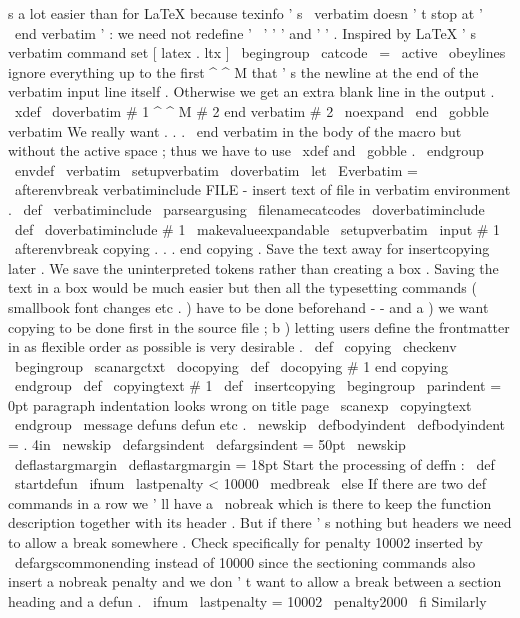 {{s
a
lot
easier
than
for
LaTeX
%
because
texinfo
'
s
\
verbatim
doesn
'
t
stop
at
'
\
end
{
verbatim
}
'
:
%
we
need
not
redefine
'
\
'
'
{
'
and
'
}
'
.
%
%
Inspired
by
LaTeX
'
s
verbatim
command
set
[
latex
.
ltx
]
%
\
begingroup
\
catcode
\
=
\
active
\
obeylines
%
%
ignore
everything
up
to
the
first
^
^
M
that
'
s
the
newline
at
the
end
%
of
the
verbatim
input
line
itself
.
Otherwise
we
get
an
extra
blank
%
line
in
the
output
.
\
xdef
\
doverbatim
#
1
^
^
M
#
2
end
verbatim
{
#
2
\
noexpand
\
end
\
gobble
verbatim
}
%
%
We
really
want
{
.
.
.
\
end
verbatim
}
in
the
body
of
the
macro
but
%
without
the
active
space
;
thus
we
have
to
use
\
xdef
and
\
gobble
.
\
endgroup
%
\
envdef
\
verbatim
{
%
\
setupverbatim
\
doverbatim
}
\
let
\
Everbatim
=
\
afterenvbreak
%
verbatiminclude
FILE
-
insert
text
of
file
in
verbatim
environment
.
%
\
def
\
verbatiminclude
{
\
parseargusing
\
filenamecatcodes
\
doverbatiminclude
}
%
\
def
\
doverbatiminclude
#
1
{
%
{
%
\
makevalueexpandable
\
setupverbatim
\
input
#
1
\
afterenvbreak
}
%
}
%
copying
.
.
.
end
copying
.
%
Save
the
text
away
for
insertcopying
later
.
%
%
We
save
the
uninterpreted
tokens
rather
than
creating
a
box
.
%
Saving
the
text
in
a
box
would
be
much
easier
but
then
all
the
%
typesetting
commands
(
smallbook
font
changes
etc
.
)
have
to
be
done
%
beforehand
-
-
and
a
)
we
want
copying
to
be
done
first
in
the
source
%
file
;
b
)
letting
users
define
the
frontmatter
in
as
flexible
order
as
%
possible
is
very
desirable
.
%
\
def
\
copying
{
\
checkenv
{
}
\
begingroup
\
scanargctxt
\
docopying
}
\
def
\
docopying
#
1
end
copying
{
\
endgroup
\
def
\
copyingtext
{
#
1
}
}
%
\
def
\
insertcopying
{
%
\
begingroup
\
parindent
=
0pt
%
paragraph
indentation
looks
wrong
on
title
page
\
scanexp
\
copyingtext
\
endgroup
}
\
message
{
defuns
}
%
defun
etc
.
\
newskip
\
defbodyindent
\
defbodyindent
=
.
4in
\
newskip
\
defargsindent
\
defargsindent
=
50pt
\
newskip
\
deflastargmargin
\
deflastargmargin
=
18pt
%
Start
the
processing
of
deffn
:
\
def
\
startdefun
{
%
\
ifnum
\
lastpenalty
<
10000
\
medbreak
\
else
%
If
there
are
two
def
commands
in
a
row
we
'
ll
have
a
\
nobreak
%
which
is
there
to
keep
the
function
description
together
with
its
%
header
.
But
if
there
'
s
nothing
but
headers
we
need
to
allow
a
%
break
somewhere
.
Check
specifically
for
penalty
10002
inserted
%
by
\
defargscommonending
instead
of
10000
since
the
sectioning
%
commands
also
insert
a
nobreak
penalty
and
we
don
'
t
want
to
allow
%
a
break
between
a
section
heading
and
a
defun
.
%
\
ifnum
\
lastpenalty
=
10002
\
penalty2000
\
fi
%
%
Similarly
}}}
